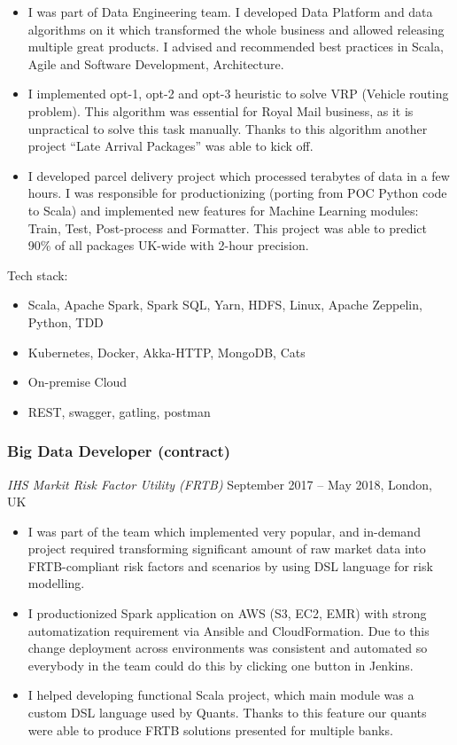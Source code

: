 \documentclass[]{rss}
\providecommand{\tightlist}{%
  \setlength{\itemsep}{0pt}\setlength{\parskip}{0pt}}
\begin{document}
\begin{resume}
\begin{itemize}
\item
  I was part of Data Engineering team. I developed Data Platform and
  data algorithms on it which transformed the whole business and allowed
  releasing multiple great products. I advised and recommended best
  practices in Scala, Agile and Software Development, Architecture.
\item
  I implemented opt-1, opt-2 and opt-3 heuristic to solve VRP (Vehicle
  routing problem). This algorithm was essential for Royal Mail
  business, as it is unpractical to solve this task manually. Thanks to
  this algorithm another project ``Late Arrival Packages'' was able to
  kick off.
\item
  I developed parcel delivery project which processed terabytes of data
  in a few hours. I was responsible for productionizing (porting from
  POC Python code to Scala) and implemented new features for Machine
  Learning modules: Train, Test, Post-process and Formatter. This
  project was able to predict 90\% of all packages UK-wide with 2-hour
  precision.
\end{itemize}

Tech stack:

\begin{itemize}
\tightlist
\item
  Scala, Apache Spark, Spark SQL, Yarn, HDFS, Linux, Apache Zeppelin,
  Python, TDD
\item
  Kubernetes, Docker, Akka-HTTP, MongoDB, Cats
\item
  On-premise Cloud
\item
  REST, swagger, gatling, postman
\end{itemize}

\subsubsection{Big Data Developer
(contract)}\label{big-data-developer-contract}

\emph{IHS Markit \textbar{} Risk Factor Utility (FRTB)} September 2017
-- May 2018, London, UK

\begin{itemize}
\item
  I was part of the team which implemented very popular, and in-demand
  project required transforming significant amount of raw market data
  into FRTB-compliant risk factors and scenarios by using DSL language
  for risk modelling.
\item
  I productionized Spark application on AWS (S3, EC2, EMR) with strong
  automatization requirement via Ansible and CloudFormation. Due to this
  change deployment across environments was consistent and automated so
  everybody in the team could do this by clicking one button in Jenkins.
\item
  I helped developing functional Scala project, which main module was a
  custom DSL language used by Quants. Thanks to this feature our quants
  were able to produce FRTB solutions presented for multiple banks.
\end{itemize}


\end{resume}
\end{document}
